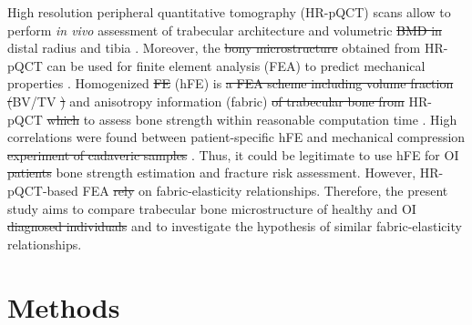 \documentclass[a4paper,fleqn]{DC_ArtStyle}
\providecommand{\DIFadd}[1]{{\protect\color{blue}{#1}}} %
\providecommand{\DIFdel}[1]{{\protect\color{red}\sout{#1}}}                      %
\providecommand{\DIFaddbegin}{} %
\providecommand{\DIFaddend}{} %
\providecommand{\DIFdelbegin}{} %
\providecommand{\DIFdelend}{} %
\begin{document}
High resolution peripheral quantitative \DIFaddbegin \DIFadd{computed }\DIFaddend tomography (HR-pQCT) scans allow \DIFaddbegin \DIFadd{one }\DIFaddend to perform \textit{in vivo} assessment of \DIFaddbegin \DIFadd{cortical and }\DIFaddend trabecular architecture and volumetric \DIFdelbegin \DIFdel{BMD in }\DIFdelend \DIFaddbegin \DIFadd{bone mineral density (BMD) in the }\DIFaddend distal radius and \DIFaddbegin \DIFadd{distal }\DIFaddend tibia \cite{Boutroy2005}. Moreover, the \DIFdelbegin \DIFdel{bony microstructure }\DIFdelend \DIFaddbegin \DIFadd{image }\DIFaddend obtained from HR-pQCT can be used for finite element analysis (FEA) to predict mechanical properties \cite{Boutroy2008}. Homogenized \DIFdelbegin \DIFdel{FE }\DIFdelend \DIFaddbegin \DIFadd{finite element }\DIFaddend (hFE) is \DIFdelbegin \DIFdel{a FEA scheme including volume fraction (}\DIFdelend \DIFaddbegin \DIFadd{based on }\DIFaddend BV/TV \DIFdelbegin \DIFdel{) }\DIFdelend and anisotropy information (fabric) \DIFdelbegin \DIFdel{of trabecular bone from }\DIFdelend \DIFaddbegin \DIFadd{from the }\DIFaddend HR-pQCT \DIFdelbegin \DIFdel{which }\DIFdelend \DIFaddbegin \DIFadd{scan that can be used }\DIFaddend to assess bone strength within \DIFaddbegin \DIFadd{a }\DIFaddend reasonable computation time \cite{Pahr2009}. High correlations were found between patient-specific hFE and mechanical compression \DIFdelbegin \DIFdel{experiment of cadaveric samples }\DIFdelend \DIFaddbegin \DIFadd{experiments of freshly frozen human samples at the distal radius }\DIFaddend \cite{Varga2011,AriasMoreno2019}. Thus, it could be legitimate to use hFE for OI \DIFdelbegin \DIFdel{patients }\DIFdelend \DIFaddbegin \DIFadd{patient's }\DIFaddend bone strength estimation and \DIFaddbegin \DIFadd{potentially }\DIFaddend fracture risk assessment. However, HR-pQCT-based FEA \DIFdelbegin \DIFdel{rely }\DIFdelend \DIFaddbegin \DIFadd{relies }\DIFaddend on fabric-elasticity relationships. Therefore, the present study aims to compare trabecular bone microstructure of healthy and OI \DIFdelbegin \DIFdel{diagnosed individuals }\DIFdelend \DIFaddbegin \DIFadd{bone samples }\DIFaddend and to investigate the hypothesis of similar fabric-elasticity relationships.

\section{Methods}
\end{document}
